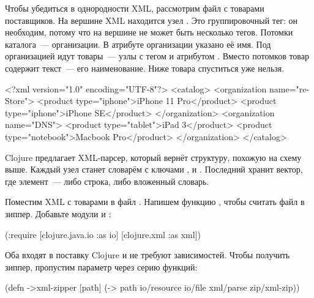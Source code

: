 Чтобы убедиться в однородности XML, рассмотрим файл с товарами поставщиков. На
вершине XML находится узел . Это группировочный тег: он необходим,
потому что на вершине не может быть несколько тегов. Потомки каталога~---
организации. В атрибуте  организации указано её имя. Под организацией
идут товары~--- узлы с тегом  и атрибутом . Вместо
потомков товар содержит текст~--- его наименование. Ниже товара спуститься уже
нельзя.

\begin{english}
  \begin{xml}
<?xml version="1.0" encoding="UTF-8"?>
<catalog>
  <organization name="re-Store">
    <product type="iphone">iPhone 11 Pro</product>
    <product type="iphone">iPhone SE</product>
  </organization>
  <organization name="DNS">
    <product type="tablet">iPad 3</product>
    <product type="notebook">Macbook Pro</product>
  </organization>
</catalog>
  \end{xml}
\end{english}

Clojure предлагает XML-парсер, который вернёт структуру, похожую на схему
 выше. Каждый узел станет словарём с ключами
,  и . Последний хранит вектор, где
элемент~--- либо строка, либо вложенный словарь.

Поместим XML с товарами в файл . Напишем функцию
, чтобы считать файл в зиппер. Добавьте модули  и
:

\begin{english}
  \begin{clojure}
(:require
 [clojure.java.io :as io]
 [clojure.xml :as xml])
  \end{clojure}
\end{english}

Оба входят в поставку Clojure и не требуют зависимостей. Чтобы получить зиппер,
пропустим параметр  через серию функций:


\begin{english}
  \begin{clojure}
(defn ->xml-zipper [path]
  (-> path
      io/resource
      io/file
      xml/parse
      zip/xml-zip))
  \end{clojure}
\end{english}

